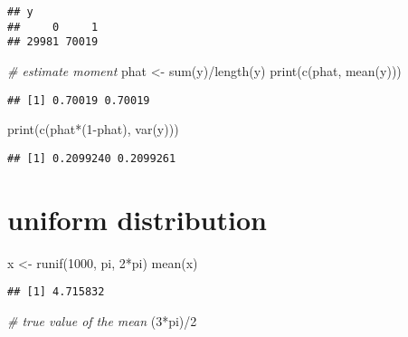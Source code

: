\documentclass[
]{article}
\newenvironment{Shaded}{\begin{snugshade}}{\end{snugshade}}
\newcommand{\CommentTok}[1]{\textcolor[rgb]{0.56,0.35,0.01}{\textit{#1}}}
\newcommand{\DecValTok}[1]{\textcolor[rgb]{0.00,0.00,0.81}{#1}}
\newcommand{\FunctionTok}[1]{\textcolor[rgb]{0.00,0.00,0.00}{#1}}
\newcommand{\NormalTok}[1]{#1}
\newcommand{\OtherTok}[1]{\textcolor[rgb]{0.56,0.35,0.01}{#1}}
\newcommand{\SpecialCharTok}[1]{\textcolor[rgb]{0.00,0.00,0.00}{#1}}
\begin{document}
\begin{verbatim}
## y
##     0     1 
## 29981 70019
\end{verbatim}

\begin{Shaded}
\begin{Highlighting}[]
\CommentTok{\# estimate moment}
\NormalTok{phat }\OtherTok{\textless{}{-}} \FunctionTok{sum}\NormalTok{(y)}\SpecialCharTok{/}\FunctionTok{length}\NormalTok{(y)}
\FunctionTok{print}\NormalTok{(}\FunctionTok{c}\NormalTok{(phat, }\FunctionTok{mean}\NormalTok{(y)))}
\end{Highlighting}
\end{Shaded}

\begin{verbatim}
## [1] 0.70019 0.70019
\end{verbatim}

\begin{Shaded}
\begin{Highlighting}[]
\FunctionTok{print}\NormalTok{(}\FunctionTok{c}\NormalTok{(phat}\SpecialCharTok{*}\NormalTok{(}\DecValTok{1}\SpecialCharTok{{-}}\NormalTok{phat), }\FunctionTok{var}\NormalTok{(y)))}
\end{Highlighting}
\end{Shaded}

\begin{verbatim}
## [1] 0.2099240 0.2099261
\end{verbatim}

\hypertarget{uniform-distribution}{%
\section{uniform distribution}\label{uniform-distribution}}

\begin{Shaded}
\begin{Highlighting}[]
\NormalTok{x }\OtherTok{\textless{}{-}} \FunctionTok{runif}\NormalTok{(}\DecValTok{1000}\NormalTok{, pi, }\DecValTok{2}\SpecialCharTok{*}\NormalTok{pi)}
\FunctionTok{mean}\NormalTok{(x)}
\end{Highlighting}
\end{Shaded}

\begin{verbatim}
## [1] 4.715832
\end{verbatim}

\begin{Shaded}
\begin{Highlighting}[]
\CommentTok{\# true value of the mean}
\NormalTok{(}\DecValTok{3}\SpecialCharTok{*}\NormalTok{pi)}\SpecialCharTok{/}\DecValTok{2}
\end{Highlighting}
\end{Shaded}
\end{document}
